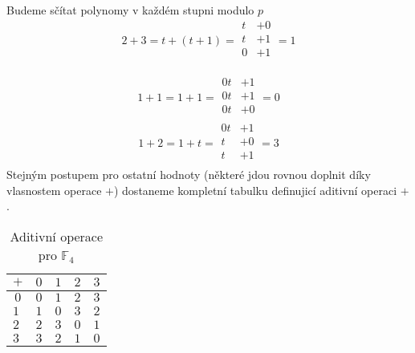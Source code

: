 \begin{example}
Budeme sčítat polynomy v každém stupni modulo $p$
\[
2 + 3 = t + (t + 1)
=
\begin{array}{rr}
    t & + 0\\
    t & + 1\\ \hline
    0 & + 1\\
      &
\end{array}
= 1
\]

\[
1 + 1 = 1 + 1
=
\begin{array}{rr}
    0t & + 1\\
    0t & + 1\\ \hline
    0t & + 0\\
       &
\end{array}
= 0
\]
\[
    1 + 2 = 1 + t
=
\begin{array}{rr}
    0t & + 1\\
    t  & + 0\\ \hline
    t  & + 1\\
       &
\end{array}
= 3
\]
Stejným postupem pro ostatní hodnoty (některé jdou rovnou doplnit díky vlasnostem operace $+$)
dostaneme kompletní tabulku definujicí aditivní operaci $+$.

\begin{table}[h]
    \centering
    \begin{tabular}{|l|l|l|l|l|}
    \hline
    \multicolumn{1}{|c|}{$+$} & \multicolumn{1}{c|}{$0$} & \multicolumn{1}{c|}{$1$} & \multicolumn{1}{c|}{$2$} & \multicolumn{1}{c|}{$3$} \\ \hline
    \multicolumn{1}{|c|}{$0$} & \multicolumn{1}{c|}{$0$} & \multicolumn{1}{c|}{$1$} & \multicolumn{1}{c|}{$2$} & \multicolumn{1}{c|}{$3$} \\ \hline
    $1$                       & $1$                      & $0$                      & $3$                      & $2$                      \\ \hline
    $2$                       & $2$                      & $3$                      & $0$                      & $1$                      \\ \hline
    $3$                       & $3$                      & $2$                      & $1$                      & $0$                      \\ \hline
    \end{tabular}
    \caption{Aditivní operace pro $\mathbb{F}_{4}$}
    \label{tab:F4_plus}
    \end{table}

\end{example}

